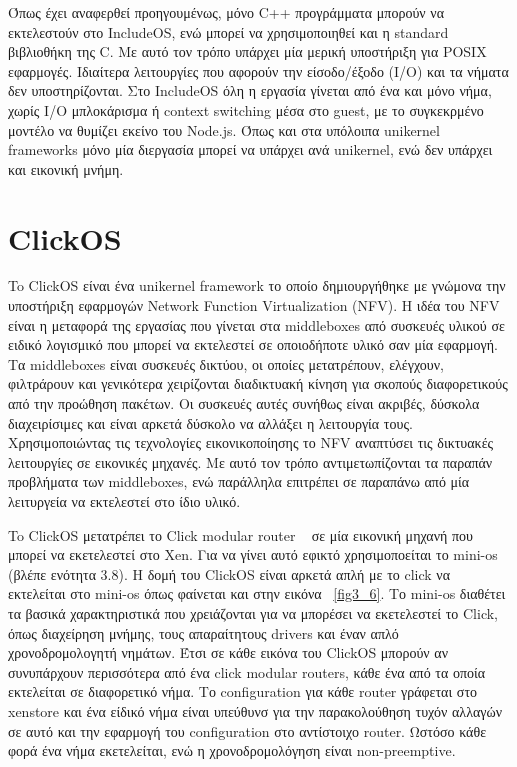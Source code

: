 Όπως έχει αναφερθεί προηγουμένως, μόνο C++ προγράμματα μπορούν να εκτελεστούν
στο IncludeOS, ενώ μπορεί να χρησιμοποιηθεί και η standard βιβλιοθήκη της C. Με
αυτό τον τρόπο υπάρχει μία μερική υποστήριξη για POSIX εφαρμογές. Ιδιαίτερα
λειτουργίες που αφορούν την είσοδο/έξοδο (Ι/Ο) και τα νήματα δεν υποστηρίζονται.
Στο IncludeOS όλη η εργασία γίνεται από ένα και μόνο νήμα, χωρίς I/O μπλοκάρισμα
ή context switching μέσα στο guest, με το συγκεκρμένο μοντέλο να θυμίζει εκείνο
του Node.js. Όπως και στα υπόλοιπα unikernel frameworks μόνο μία διεργασία
μπορεί να υπάρχει ανά unikernel, ενώ δεν υπάρχει και εικονική μνήμη.


\section{ClickOS}
To ClickOS είναι ένα unikernel framework το οποίο δημιουργήθηκε με γνώμονα την
υποστήριξη εφαρμογών Network Function Virtualization (NFV). H ιδέα του NFV είναι
η μεταφορά της εργασίας που γίνεται στα middleboxes από συσκευές υλικού σε
ειδικό λογισμικό που μπορεί να εκτελεστεί σε οποιοδήποτε υλικό σαν μία εφαρμογή.
Τα middleboxes είναι συσκευές δικτύου, οι οποίες μετατρέπουν, ελέγχουν,
φιλτράρουν και γενικότερα χειρίζονται διαδικτυακή κίνηση για σκοπούς
διαφορετικούς από την προώθηση πακέτων. Οι συσκευές αυτές συνήθως είναι ακριβές,
δύσκολα διαχειρίσιμες και είναι αρκετά δύσκολο να αλλάξει η λειτουργία τους.
Χρησιμοποιώντας τις τεχνολογίες εικονικοποίησης το NFV αναπτύσει τις δικτυακές
λειτουργίες σε εικονικές μηχανές. Με αυτό τον τρόπο αντιμετωπίζονται τα παραπάν
προβλήματα των middleboxes, ενώ παράλληλα επιτρέπει σε παραπάνω από μία
λειτυργεία να εκτελεστεί στο ίδιο υλικό.

To ClickOS μετατρέπει το Click modular router ~\cite{kohler2000click} σε μία
εικονική μηχανή που μπορεί να εκετελεστεί στο Xen. Για να γίνει αυτό εφικτό
χρησιμοποείται το mini-os (βλέπε ενότητα 3.8). H δομή του ClickOS είναι αρκετά
απλή με το click να εκτελείται στο mini-os όπως φαίνεται και στην εικόνα
~\ref{fig3_6}. Το mini-os διαθέτει τα βασικά χαρακτηριστικά που χρειάζονται για
να μπορέσει να εκετελεστεί το Click, όπως διαχείρηση μνήμης, τους απαραίτητους
drivers και έναν απλό χρονοδρομολογητή νημάτων. Έτσι σε κάθε εικόνα του ClickOS
μπορούν αν συνυπάρχουν περισσότερα από ένα click modular routers, κάθε ένα από
τα οποία εκτελείται σε διαφορετικό νήμα. Το configuration για κάθε router
γράφεται στο xenstore και ένα είδικό νήμα είναι υπεύθυνσ για την παρακολούθηση
τυχόν αλλαγών σε αυτό και την εφαρμογή του configuration στο αντίστοιχο router.
Ωστόσο κάθε φορά ένα νήμα εκετελείται, ενώ η χρονοδρομολόγηση είναι
non-preemptive. 

